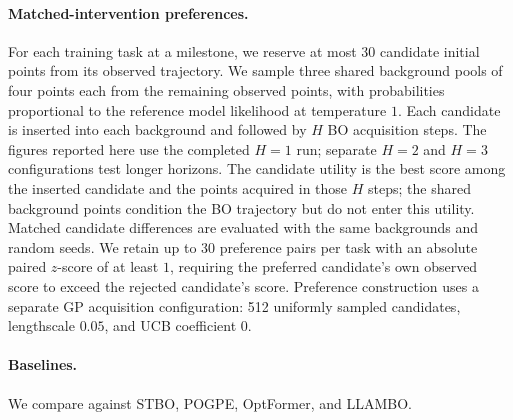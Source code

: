 \paragraph{Matched-intervention preferences.}
For each training task at a milestone, we reserve at most 30 candidate
initial points from its observed trajectory.  We sample three shared
background pools of four points each from the remaining observed points,
with probabilities proportional to the reference model likelihood at
temperature $1$.  Each candidate is inserted into each background and
followed by $H$ BO acquisition steps. The figures reported here use
the completed $H=1$ run; separate $H=2$ and $H=3$ configurations test
longer horizons.  The candidate utility is the best score among the
inserted candidate and the points acquired in those $H$ steps; the shared
background points condition the BO trajectory but do not enter this
utility.  Matched candidate differences are evaluated with the same
backgrounds and random seeds.  We retain up to 30 preference pairs per
task with an absolute paired $z$-score of at least $1$, requiring the
preferred candidate's own observed score to exceed the rejected
candidate's score.  Preference construction uses a separate GP acquisition
configuration: 512 uniformly sampled candidates, lengthscale $0.05$, and
UCB coefficient $0$.

\paragraph{Baselines.}
We compare against STBO, POGPE, OptFormer, and LLAMBO.
